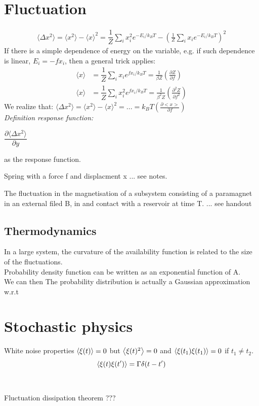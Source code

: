 \documentclass[10pt,a4paper]{article}
\newcommand{\definition}[3]
    {
    \textit{Definition #1: }
    \begin{center}
        {#2}
    \end{center}
    {#3}\\
    }
\begin{document}
\section{Fluctuation}
\begin{align*}
    \langle \Delta x^2\rangle = \langle x^2\rangle -\langle x\rangle ^2 
    =\dfrac{1}{Z}\sum_i x_i^2 e^{-E_i/k_BT} - (\frac{1}{Z}\sum_i x_i e^{-E_i/k_BT})^2
\end{align*}
If there is a simple dependence of energy on the variable, 
e.g. if such dependence is linear, $E_i=-fx_i$, then a general trick applies:
\begin{align*}
    \langle x\rangle &= \dfrac{1}{Z}\sum_i x_i e^{fx_i/k_BT} = \frac{1}{\beta Z}(\frac{\partial Z}{\partial f})\\
    \langle x\rangle &= \dfrac{1}{Z}\sum_i x_i^2 e^{fx_i/k_BT} = \frac{1}{\beta^2 Z}(\frac{\partial^2 Z}{\partial f^2})
\end{align*}
We realize that:
$\langle \Delta x^2\rangle = \langle x^2\rangle -\langle x\rangle ^2 = ... = k_BT(\frac{\partial <x>}{\partial f})$\\
\definition{response function}{
    $\dfrac{\partial \langle \Delta x^2\rangle}{\partial y}$
}{as the response function.}
\begin{example}
    {Spring with a force f and displacment x}
    {... see notes.}
\end{example}
\begin{example}
    {The fluctuation in the magnetisation of a subsystem consisting of a paramagnet in an external filed B, in and contact with a reservoir at time T.}
    {... see handout}
\end{example}
\subsection{Thermodynamics}
In a large system, the curvature of the availability function is related to the size of the fluctuations.\\
Probability density function can be written as an exponential function of A.\\
We can then 
The probability distribution is actually a Gaussian approximation w.r.t
\section{Stochastic physics}
    \begin{theorem}
        {White noise properties}{
        $\expval{\xi(t)}=0$ but $\expval{\xi(t)^2}=0$ and  $\expval{\xi(t_1)\xi(t_1)}=0$ if $t_1\neq t_2$.
        \begin{equation*}
            \expval{\xi(t)\xi(t')}=\Gamma\delta(t-t')
        \end{equation*}
        }
    \end{theorem}
    \\
    \begin{theorem}
        {Fluctuation dissipation theorem}{
        ???
        }
    \end{theorem}
\end{document}
